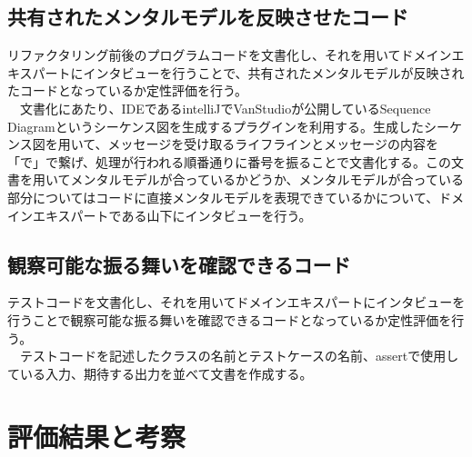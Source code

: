 \documentclass[11pt, a4paper]{jreport}
\begin{document}
\subsection{共有されたメンタルモデルを反映させたコード}
リファクタリング前後のプログラムコードを文書化し、それを用いてドメインエキスパートにインタビューを行うことで、共有されたメンタルモデルが反映されたコードとなっているか定性評価を行う。
\\　文書化にあたり、IDEであるintelliJでVanStudioが公開しているSequence Diagramというシーケンス図を生成するプラグインを利用する。生成したシーケンス図を用いて、メッセージを受け取るライフラインとメッセージの内容を「で」で繋げ、処理が行われる順番通りに番号を振ることで文書化する。この文書を用いてメンタルモデルが合っているかどうか、メンタルモデルが合っている部分についてはコードに直接メンタルモデルを表現できているかについて、ドメインエキスパートである山下にインタビューを行う。
\subsection{観察可能な振る舞いを確認できるコード}
テストコードを文書化し、それを用いてドメインエキスパートにインタビューを行うことで観察可能な振る舞いを確認できるコードとなっているか定性評価を行う。
\\　テストコードを記述したクラスの名前とテストケースの名前、assertで使用している入力、期待する出力を並べて文書を作成する。
\section{評価結果と考察}
\end{document}
